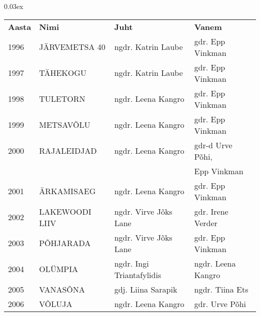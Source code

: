 \documentclass[10pt]{book}
\begin{document}
{\centering\scriptsize\arrayrulewidth 0.03ex
\begin{tabular*}{1.0\textwidth}{@{\extracolsep{\fill}}@{}l@{}@{}l@{}@{}l@{}@{}l@{}}
\bf{Aasta}	&	\bf{Nimi}				&	\bf{Juht}				&	\bf{Vanem}\\[2mm]
	1996	&	J\"ARVEMETSA 40			&	ngdr. Katrin Laube		&	gdr. Epp Vinkman\\[2mm]
	1997	&	T\"AHEKOGU				&	ngdr. Katrin Laube		&	gdr. Epp Vinkman\\[2mm]
	1998	&	TULETORN				&	ngdr. Leena Kangro		&	gdr. Epp Vinkman\\[2mm]
	1999	&	METSAV\~OLU				&	ngdr. Leena Kangro		&	gdr. Epp Vinkman\\[2mm]
	2000	&	RAJALEIDJAD				&	ngdr. Leena Kangro		&	gdr-d  Urve P\~ohi,\\
			&							&							&	Epp Vinkman\\[2mm]
	2001	&	\"ARKAMISAEG			&	ngdr. Leena Kangro		&	gdr. Epp Vinkman\\[2mm]
	2002	&	LAKEWOODI LIIV			&	ngdr. Virve J\~oks Lane	&	gdr. Irene Verder\\[2mm]
	2003	&	P\~OHJARADA				&	ngdr. Virve J\~oks Lane	&	gdr. Epp Vinkman\\[2mm]
	2004	&	OL\"UMPIA				&	ngdr. Ingi Triantafylidis&	ngdr. Leena Kangro\\[2mm]
	2005	&	VANAS\~ONA				&	gdj. Liina Sarapik		&	ngdr. Tiina Ets\\[2mm]
	2006	&	V\~OLUJA				&	ngdr. Leena Kangro		&	gdr. Urve P\~ohi\\[2mm]
\end{tabular*}}

\clearpage
\end{document}
